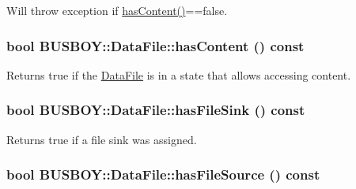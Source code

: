 Will throw exception if \hyperlink{classBUSBOY_1_1DataFile_aa127c5ce6db57b3e35151a2c44404f0a}{hasContent()}==false. \hypertarget{classBUSBOY_1_1DataFile_aa127c5ce6db57b3e35151a2c44404f0a}{
\subsubsection[{hasContent}]{\setlength{\rightskip}{0pt plus 5cm}bool BUSBOY::DataFile::hasContent () const}}
\label{classBUSBOY_1_1DataFile_aa127c5ce6db57b3e35151a2c44404f0a}


Returns true if the \hyperlink{classBUSBOY_1_1DataFile}{DataFile} is in a state that allows accessing content. \hypertarget{classBUSBOY_1_1DataFile_a08b8fa0766abdebdc757bb493658eadf}{
\subsubsection[{hasFileSink}]{\setlength{\rightskip}{0pt plus 5cm}bool BUSBOY::DataFile::hasFileSink () const}}
\label{classBUSBOY_1_1DataFile_a08b8fa0766abdebdc757bb493658eadf}


Returns true if a file sink was assigned. \hypertarget{classBUSBOY_1_1DataFile_aa91fcade9e4c1c1f40eb4725463eecc2}{
\subsubsection[{hasFileSource}]{\setlength{\rightskip}{0pt plus 5cm}bool BUSBOY::DataFile::hasFileSource () const}}
\label{classBUSBOY_1_1DataFile_aa91fcade9e4c1c1f40eb4725463eecc2}


